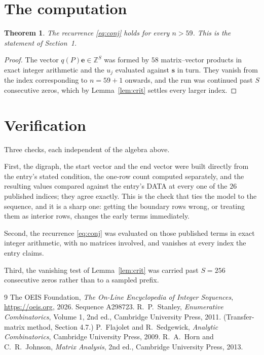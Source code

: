 \documentclass[11pt,a4paper]{article}
\theoremstyle{plain}
\newtheorem{theorem}{Theorem}
\theoremstyle{definition}
\begin{document}
\section{The computation}

\begin{theorem}
The recurrence \eqref{eq:conj} holds for every $n>59$. This is the statement of
Section~1.
\end{theorem}

\begin{proof}
The vector $q(P)\mathbf{e}\in\mathbb{Z}^{S}$ was formed by $58$ matrix--vector
products in exact integer arithmetic and the $u_j$ evaluated against $\mathbf{s}$ in turn.
They vanish from the index corresponding to $n=59+1$ onwards, and the run was continued
past $S$ consecutive zeros, which by Lemma~\ref{lem:crit} settles every larger index.
\end{proof}

\section{Verification}

Three checks, each independent of the algebra above.

First, the digraph, the start vector and the end vector were built directly from the
entry's stated condition, the one-row count computed separately, and the resulting values
compared against the entry's DATA at every one of the $26$ published indices; they
agree exactly. This is the check that ties the model to the sequence, and it is a sharp one:
getting the boundary rows wrong, or treating them as interior rows, changes the early terms
immediately.

Second, the recurrence \eqref{eq:conj} was evaluated on those published terms in exact
integer arithmetic, with no matrices involved, and vanishes at every index the entry claims.

Third, the vanishing test of Lemma~\ref{lem:crit} was carried past $S=256$ consecutive
zeros rather than to a sampled prefix.

\begin{thebibliography}{9}
 The OEIS Foundation, \emph{The On-Line Encyclopedia of Integer
Sequences}, \url{https://oeis.org}, 2026. Sequence A298723.
 R.~P.~Stanley, \emph{Enumerative Combinatorics}, Volume 1, 2nd ed.,
Cambridge University Press, 2011. (Transfer-matrix method, Section 4.7.)
 P.~Flajolet and R.~Sedgewick, \emph{Analytic Combinatorics}, Cambridge
University Press, 2009.
 R.~A.~Horn and C.~R.~Johnson, \emph{Matrix Analysis}, 2nd ed., Cambridge
University Press, 2013.
\end{thebibliography}
\end{document}
